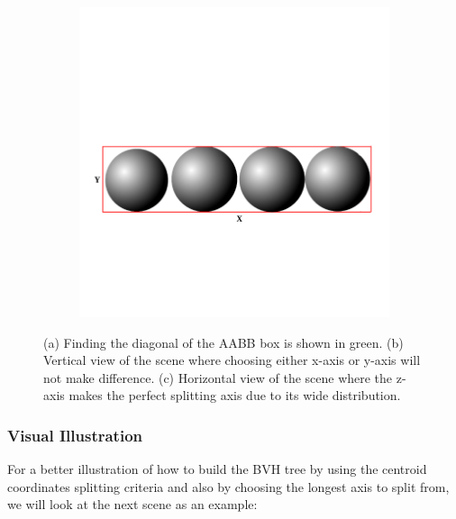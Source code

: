 \documentclass[11pt,a4paper]{article}
\begin{document}
\begin{figure}[H]
\begin{subfigure}[t]{0.3\textwidth}
         \caption{}
         \label{fig:pi_5000}
     \end{subfigure}
     \hfill
     \begin{subfigure}[t]{0.3\textwidth}
         \centering
         \includegraphics[width=\textwidth]{images/LONGAXIS_Z.png}
         \caption{}
         \label{fig:pi_18000}
     \end{subfigure}
        \captionsetup{justification=centering,margin=2cm}
        \caption{(a) Finding the diagonal of the AABB box is shown in green. (b) Vertical view of the scene where choosing either x-axis or y-axis will not make difference. (c) Horizontal view of the scene where the z-axis makes the perfect splitting axis due to its wide distribution.}
        \label{fig:aabbexample}
\end{figure}

\subsubsection{Visual Illustration}
For a better illustration of how to build the BVH tree by using the centroid coordinates splitting criteria and also by choosing the longest axis to split from, we will look at the next scene as an example: 
\end{document}
